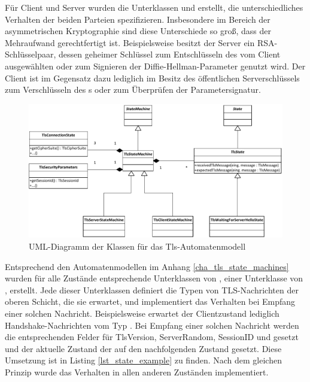 Für Client und Server wurden die Unterklassen  und  erstellt, die unterschiedliches Verhalten der beiden Parteien spezifizieren. Insbesondere im Bereich der asymmetrischen Kryptographie sind diese Unterschiede so groß, dass der Mehraufwand gerechtfertigt ist. Beispielsweise besitzt der Server ein RSA-Schlüsselpaar, dessen geheimer Schlüssel zum Entschlüsseln des vom Client ausgewählten \premastersecret{} oder zum Signieren der Diffie-Hellman-Parameter genutzt wird. Der Client ist im Gegensatz dazu lediglich im Besitz des öffentlichen Serverschlüssels zum Verschlüsseln des \premastersecret{}s oder zum Überprüfen der Parametersignatur.

\begin{figure}
	\centering
	\includegraphics[scale=0.9]{Diagrams/uml/tls_state_machine.pdf} 
	\caption{UML-Diagramm der Klassen für das Tls-Automatenmodell}
	\label{fig_uml_tls_state_machine}
\end{figure}

Entsprechend den Automatenmodellen im Anhang \ref{cha_tls_state_machines} wurden für alle Zustände entsprechende Unterklassen von , einer Unterklasse von , erstellt. Jede dieser Unterklassen definiert die Typen von TLS-Nachrichten der oberen Schicht, die sie erwartet, und implementiert das Verhalten bei Empfang einer solchen Nachricht. Beispielsweise erwartet der Clientzustand  lediglich Handshake-Nachrichten vom Typ \serverhello{}. Bei Empfang einer solchen Nachricht werden die entsprechenden Felder für TlsVersion, ServerRandom, SessionID und \ciphersuite{} gesetzt und der aktuelle Zustand der  auf den nachfolgenden Zustand gesetzt. Diese Umsetzung ist in Listing \ref{lst_state_example} zu finden. Nach dem gleichen Prinzip wurde das Verhalten in allen anderen Zuständen implementiert. 

